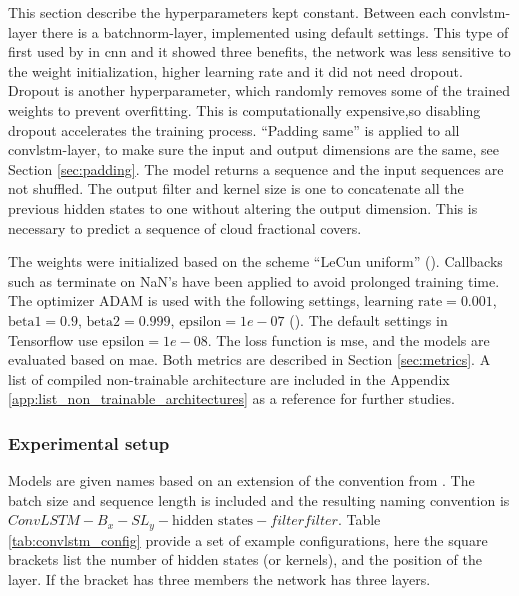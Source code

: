 This section describe the hyperparameters kept constant. Between each \acrshort{convlstm}-layer there is a \acrfull{batchnorm}-layer, implemented using default settings. This type of %
first used by  in \acrshort{cnn} and it showed three benefits, the network was less sensitive to the weight initialization, higher learning rate and it did not need dropout. Dropout is another hyperparameter, which randomly removes some of the trained weights to prevent overfitting. This is computationally expensive,so disabling dropout accelerates the training process.
``Padding same'' is applied to all \acrshort{convlstm}-layer, to make sure the input and output dimensions are the same, see Section \ref{sec:padding}. The model returns a sequence and the input sequences are not shuffled. 
The output filter and kernel size is one to concatenate all the previous hidden states to one without altering the output dimension. This is necessary to predict a sequence of cloud fractional covers. 

The weights were initialized based on the scheme ``LeCun uniform''  (\cite{Lecun98efficientbackprop}). Callbacks such as %
terminate on NaN's have been applied to avoid prolonged training time. The optimizer ADAM is used with the following settings, $\text{learning rate}=0.001$, $\text{beta1}=0.9$, $\text{beta2}=0.999$, $\text{epsilon}=1e-07$ (\cite{Kingma2015Adam:Optimization}). The default settings in Tensorflow use $\text{epsilon}=1e-08$. The loss function is \acrfull{mse}, and the models are evaluated based on \acrfull{mae}. Both metrics are described in Section \ref{sec:metrics}. 
A list of compiled non-trainable architecture are included in the Appendix \ref{app:list_non_trainable_architectures} as a reference for further studies.

\subsubsection{Experimental setup}
Models are given names based on an extension of the convention from .
The batch size and sequence length is included and 
the resulting naming convention is  $ConvLSTM-B_{x}-SL_{y}-\text{hidden states}-filter$\times$filter$. Table \ref{tab:convlstm_config} provide a set of example configurations, here the square brackets list the number of hidden states (or kernels), and the position of the layer. If the bracket has three members the network has three layers. %


